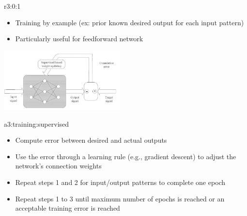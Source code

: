 \documentclass{tron}
\begin{document}
\begin{remark}{r3:0:1}
	\begin{itemize}
		\item Training by example (ex: prior known desired output for each input pattern)
		\item Particularly useful for feedforward network
	\end{itemize}
	
	\includegraphics[width=240px]{Figs/Lec4/supervised}
	
	\begin{algo}[Training]{a3:training:supervised}
	\begin{itemize}
		\item Compute error between desired and actual outputs 
		\item Use the error through a learning rule (e.g., gradient descent) to adjust the network’s connection weights 
		\item Repeat steps 1 and 2 for input/output patterns to complete one epoch 
		\item Repeat steps 1 to 3 until maximum number of epochs is reached or an acceptable training error is reached
	\end{itemize}
	\end{algo}
\end{remark}
\end{document}
